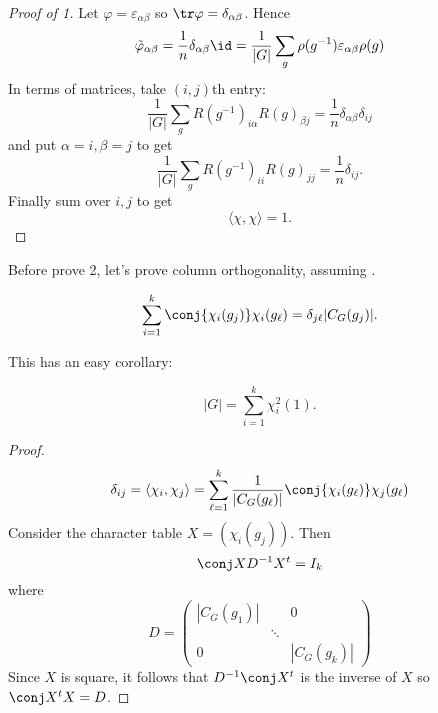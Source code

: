 \documentclass[a4paper]{article}
\begin{document}
\begin{proof}[Proof of  1]
Let \(\varphi = \varepsilon_{\alpha\beta}\) so \(\tr \varphi = \delta_{\alpha\beta}\). Hence
\[
  \tilde \varphi_{\alpha\beta}
  = \frac{1}{n} \delta_{\alpha\beta} \id
  = \frac{1}{|G|} \sum_g \rho(g^{-1}) \varepsilon_{\alpha\beta} \rho(g)
\]
In terms of matrices, take \((i, j)\)th entry:
\[
  \frac{1}{|G|} \sum_g R(g^{-1})_{i\alpha} R(g)_{\beta j} = \frac{1}{n} \delta_{\alpha\beta} \delta_{ij}
\]
and put \(\alpha = i, \beta = j\) to get
\[
  \frac{1}{|G|} \sum_g R(g^{-1})_{ii} R(g)_{jj} = \frac{1}{n} \delta_{ij}.
\]
Finally sum over \(i, j\) to get
\[
  \langle \chi, \chi \rangle = 1.
\]
\end{proof}

Before prove 2, let's prove column orthogonality, assuming .

\begin{corollary}
  \[
    \sum_{i = 1}^k \conj{\chi_i(g_j)} \chi_i(g_\ell) = \delta_{j\ell} |C_G(g_j)|.
  \]
\end{corollary}

This has an easy corollary:

\begin{theorem}
  \[
    |G| = \sum_{i = 1}^k \chi_i^2(1).
  \]
\end{theorem}

\begin{proof}
  \[
    \delta_{ij}
    = \langle \chi_i, \chi_j \rangle
    = \sum_{\ell = 1}^k \frac{1}{|C_G(g_\ell)|} \conj{\chi_i(g_\ell)} \chi_j(g_\ell)
  \]
  Consider the character table \(X = (\chi_i(g_j))\). Then
  \[
    \conj X D^{-1} X^t = I_k
  \]
  where
  \[
    D =
    \begin{pmatrix}
      |C_G(g_1)| & & 0 \\
      & \ddots \\
      0 & & |C_G(g_k)|
    \end{pmatrix}
  \]
  Since \(X\) is square, it follows that \(D^{-1} \conj X^t\) is the inverse of \(X\) so \(\conj X^t X = D\).
\end{proof}
\end{document}
